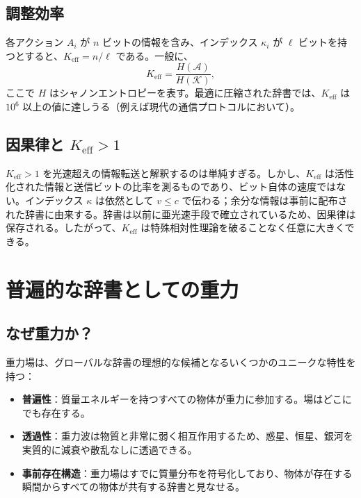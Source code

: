 \documentclass[12pt,a4paper]{article}
\newcommand{\Keff}{K_{\mathrm{eff}}}
\begin{document}
	\subsection{調整効率}
	\label{subsec:keff}
	
	各アクション \(A_i\) が \(n\) ビットの情報を含み、インデックス \(\kappa_i\) が \(\ell\) ビットを持つとすると、\(\Keff = n/\ell\) である。一般に、
	\begin{equation}
		\Keff = \frac{H(\mathcal{A})}{H(\mathcal{K})},
	\end{equation}
	ここで \(H\) はシャノンエントロピーを表す。最適に圧縮された辞書では、\(\Keff\) は \(10^6\) 以上の値に達しうる（例えば現代の通信プロトコルにおいて）。
	
	\subsection{因果律と \(K_{\mathrm{eff}} > 1\)}
	\label{subsec:causality}
	
	\(\Keff > 1\) を光速超えの情報転送と解釈するのは単純すぎる。しかし、\(\Keff\) は活性化された情報と送信ビットの比率を測るものであり、ビット自体の速度ではない。インデックス \(\kappa\) は依然として \(v \le c\) で伝わる；余分な情報は事前に配布された辞書に由来する。辞書は以前に亜光速手段で確立されているため、因果律は保存される。したがって、\(\Keff\) は特殊相対性理論を破ることなく任意に大きくできる。
	
	\section{普遍的な辞書としての重力}
	\label{sec:gravity}
	
	\subsection{なぜ重力か？}
	
	重力場は、グローバルな辞書の理想的な候補となるいくつかのユニークな特性を持つ：
	\begin{itemize}
		\item \textbf{普遍性}：質量エネルギーを持つすべての物体が重力に参加する。場はどこにでも存在する。
		\item \textbf{透過性}：重力波は物質と非常に弱く相互作用するため、惑星、恒星、銀河を実質的に減衰や散乱なしに透過できる。
		\item \textbf{事前存在構造}：重力場はすでに質量分布を符号化しており、物体が存在する瞬間からすべての物体が共有する辞書と見なせる。
	\end{itemize}
	
\end{document}
